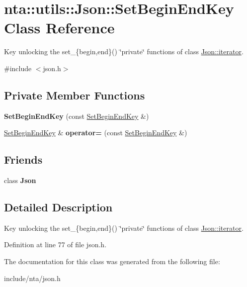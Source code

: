 \hypertarget{classnta_1_1utils_1_1Json_1_1SetBeginEndKey}{}\section{nta\+:\+:utils\+:\+:Json\+:\+:Set\+Begin\+End\+Key Class Reference}
\label{classnta_1_1utils_1_1Json_1_1SetBeginEndKey}


Key unlocking the set\+\_\+\{begin,end\}() \char`\"{}private\char`\"{} functions of class \hyperlink{classnta_1_1utils_1_1Json_1_1iterator}{Json\+::iterator}.  




{\ttfamily \#include $<$json.\+h$>$}

\subsection*{Private Member Functions}
\begin{DoxyCompactItemize}
\item 
\mbox{\label{classnta_1_1utils_1_1Json_1_1SetBeginEndKey_a8b763786a663ac1f4480536569502b03}} 
{\bfseries Set\+Begin\+End\+Key} (const \hyperlink{classnta_1_1utils_1_1Json_1_1SetBeginEndKey}{Set\+Begin\+End\+Key} \&)
\item 
\mbox{\label{classnta_1_1utils_1_1Json_1_1SetBeginEndKey_acedfb4474597563556da2ae4df424e5e}} 
\hyperlink{classnta_1_1utils_1_1Json_1_1SetBeginEndKey}{Set\+Begin\+End\+Key} \& {\bfseries operator=} (const \hyperlink{classnta_1_1utils_1_1Json_1_1SetBeginEndKey}{Set\+Begin\+End\+Key} \&)
\end{DoxyCompactItemize}
\subsection*{Friends}
\begin{DoxyCompactItemize}
\item 
\mbox{\label{classnta_1_1utils_1_1Json_1_1SetBeginEndKey_a7dd8a79e9210a2a230d000eee63c6e8a}} 
class {\bfseries Json}
\end{DoxyCompactItemize}


\subsection{Detailed Description}
Key unlocking the set\+\_\+\{begin,end\}() \char`\"{}private\char`\"{} functions of class \hyperlink{classnta_1_1utils_1_1Json_1_1iterator}{Json\+::iterator}. 

Definition at line 77 of file json.\+h.



The documentation for this class was generated from the following file\+:\begin{DoxyCompactItemize}
\item 
include/nta/json.\+h\end{DoxyCompactItemize}

